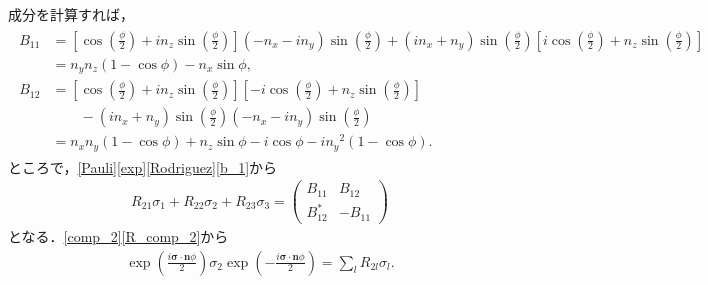 \documentclass[a4paper]{ltjsreport}
\begin{document}
成分を計算すれば，
\begin{align}
  \begin{split}
    B_{11} & = \left[\cos\left(\frac{\phi}{2}\right)+in_z\sin\left(\frac{\phi}{2}\right)\right](-n_x-in_y)\sin\left(\frac{\phi}{2}\right)+(in_x+n_y)\sin\left(\frac{\phi}{2}\right)\left[i\cos\left(\frac{\phi}{2}\right)+n_z\sin\left(\frac{\phi}{2}\right)\right]\\
    & = n_yn_z(1-\cos\phi)-n_x\sin\phi,\\
    B_{12} & = \left[\cos\left(\frac{\phi}{2}\right)+in_z\sin\left(\frac{\phi}{2}\right)\right]\left[-i\cos\left(\frac{\phi}{2}\right)+n_z\sin\left(\frac{\phi}{2}\right)\right] \\
    & \qquad - (in_x+n_y)\sin\left(\frac{\phi}{2}\right)(-n_x-in_y)\sin\left(\frac{\phi}{2}\right)\\
    & = n_xn_y(1-\cos\phi)+n_z\sin\phi-i\cos\phi-in_y{}^2(1-\cos\phi).
  \end{split}
  \label{b_1}
\end{align}
ところで，\eqref{Pauli}\eqref{exp}\eqref{Rodriguez}\eqref{b_1}から
\begin{align}
  R_{21}\sigma_1+R_{22}\sigma_2+R_{23}\sigma_3 =
  \begin{pmatrix}
    B_{11} & B_{12}\\
    B_{12}^* & -B_{11}
  \end{pmatrix}
  \label{R_comp_2}
\end{align}
となる．\eqref{comp_2}\eqref{R_comp_2}から
\begin{align}
  \exp\left(\frac{i\boldsymbol{\sigma}\cdot\boldsymbol{n}\phi}{2}\right)\sigma_2\exp\left(-\frac{i\boldsymbol{\sigma}\cdot\boldsymbol{n}\phi}{2}\right)=\sum_lR_{2l}\sigma_l.\label{result_2}
\end{align}
\end{document}
